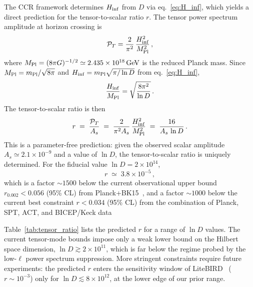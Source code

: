 The CCR framework determines $H_{\rm inf}$ from $D$ via eq.~\eqref{eq:H_inf},
which yields a direct prediction for the tensor-to-scalar ratio $r$.
The tensor power spectrum amplitude at horizon crossing is
\begin{equation}
  \mathcal{P}_T = \frac{2}{\pi^2}\,\frac{H_{\rm inf}^2}{M_{\rm Pl}^2}\,,
  \label{eq:tensor_spectrum}
\end{equation}
where $M_{\rm Pl} = (8\pi G)^{-1/2} \simeq 2.435\times 10^{18}\,\mathrm{GeV}$
is the reduced Planck mass. Since $M_{\rm Pl} = m_{\rm Pl}/\sqrt{8\pi}$ and
$H_{\rm inf} = m_{\rm Pl}\sqrt{\pi/\ln D}$ from eq.~\eqref{eq:H_inf},
\begin{equation}
  \frac{H_{\rm inf}}{M_{\rm Pl}} = \sqrt{\frac{8\pi^2}{\ln D}}\,.
\end{equation}
The tensor-to-scalar ratio is then
\begin{equation}
  r \;=\; \frac{\mathcal{P}_T}{A_s}
    \;=\; \frac{2}{\pi^2 A_s}\,\frac{H_{\rm inf}^2}{M_{\rm Pl}^2}
    \;=\; \frac{16}{A_s\,\ln D}\,.
  \label{eq:r_CCR}
\end{equation}
This is a parameter-free prediction: given the observed scalar amplitude
$A_s \simeq 2.1\times 10^{-9}$ and a value of $\ln D$, the tensor-to-scalar
ratio is uniquely determined. For the fiducial value $\ln D = 2\times 10^{14}$,
\begin{equation}
  r \;\simeq\; 3.8\times 10^{-5}\,,
\end{equation}
which is a factor $\sim 1500$ below the current observational upper bound
$r_{0.002} < 0.056$ (95\% CL) from Planck+BK15~\cite{Planck:2018inflation},
and a factor $\sim 1000$ below the current best constraint
$r < 0.034$ (95\% CL) from the combination of Planck,
SPT, ACT, and BICEP/Keck data~\cite{Campeti:2025}

Table~\ref{tab:tensor_ratio} lists the predicted $r$ for a range of $\ln D$ values.
The current tensor-mode bounds impose only a weak lower bound on the Hilbert
space dimension, $\ln D \gtrsim 2\times 10^{11}$, which is far below the regime
probed by the low-$\ell$ power spectrum suppression. More stringent constraints
require future experiments: the predicted $r$ enters the sensitivity window
of LiteBIRD~\cite{LiteBIRD:2022} ($r \sim 10^{-3}$) only for
$\ln D \lesssim 8\times 10^{12}$, at the lower edge of our prior range.

